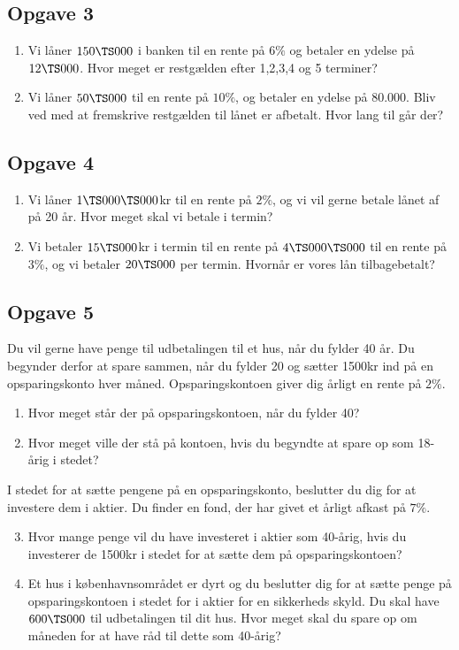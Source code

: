 \subsection*{Opgave 3}
\begin{enumerate}[label=\roman*)]
\item Vi låner $150 \TS 000$ i banken til en rente på $6\%$ og betaler en ydelse på $12 \TS 000$. Hvor meget er restgælden efter 1,2,3,4 og 5 terminer?
\item Vi låner $50 \TS 000$ til en rente på $10\%$, og betaler en ydelse på 80.000. Bliv ved med at fremskrive restgælden til lånet er afbetalt. Hvor lang til går der?
\end{enumerate}

\subsection*{Opgave 4}
\begin{enumerate}[label=\roman*)]
\item Vi låner $1\TS 000 \TS 000 $kr til en rente på $2\%$, og vi vil gerne betale lånet af på 20 år. Hvor meget skal vi betale i termin?
\item Vi betaler $15 \TS 000$kr i termin til en rente på $4\TS 000 \TS 000$ til en rente på $3\%$, og vi betaler $20 \TS 000$ per termin. Hvornår er vores lån tilbagebetalt?
\end{enumerate}

\subsection*{Opgave 5}
Du vil gerne have penge til udbetalingen til et hus, når du fylder 40 år. Du begynder derfor at spare sammen, når du fylder 20 og sætter 1500kr ind på en opsparingskonto hver måned. Opsparingskontoen giver dig årligt en rente på $2\%$.
\begin{enumerate}[label=\roman*)]
	\item Hvor meget står der på opsparingskontoen, når du fylder 40?
	\item Hvor meget ville der stå på kontoen, hvis du begyndte at spare op som 18-årig i stedet?
\end{enumerate}
I stedet for at sætte pengene på en opsparingskonto, beslutter du dig for at investere dem i aktier. Du finder en fond, der har givet et årligt afkast på $7\%$. 
\begin{enumerate}[label=\roman*)]
	\setcounter{enumi}{2}
	\item Hvor mange penge vil du have investeret i aktier som 40-årig, hvis du investerer de 1500kr 
	i stedet for at sætte dem på opsparingskontoen?
	\item Et hus i københavnsområdet er dyrt og du beslutter dig for at sætte penge på opsparingskontoen i stedet for i aktier for en sikkerheds skyld. Du skal have $600\TS 000$ til udbetalingen til dit hus. Hvor meget skal du spare op om måneden for at have råd til dette som 40-årig?
\end{enumerate}

